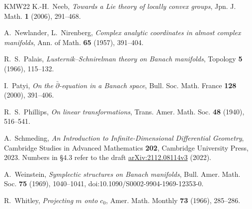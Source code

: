 \begin{thebibliography}{KMW22}
K.-H.~Neeb, \emph{Towards a Lie theory of locally convex groups}, Jpn. J. Math. \textbf{1}
(2006), 291--468.

A.~Newlander, L.~Nirenberg, \emph{Complex analytic coordinates in almost complex manifolds},
Ann. of Math. \textbf{65} (1957), 391--404.

R.~S.~Palais, \emph{Lusternik--Schnirelman theory on Banach manifolds}, Topology \textbf{5}
(1966), 115--132.

I.~Patyi, \emph{On the $\bar\partial$-equation in a Banach space}, Bull. Soc. Math. France
\textbf{128} (2000), 391--406.

R.~S.~Phillips, \emph{On linear transformations}, Trans. Amer. Math. Soc. \textbf{48} (1940),
516--541.

A.~Schmeding, \emph{An Introduction to Infinite-Dimensional Differential Geometry}, Cambridge
Studies in Advanced Mathematics \textbf{202}, Cambridge University Press, 2023. Numbers in
\S4.3 refer to the draft \href{https://arxiv.org/abs/2112.08114v3}{arXiv:2112.08114v3} (2022).

A.~Weinstein, \emph{Symplectic structures on Banach manifolds}, Bull. Amer. Math. Soc.
\textbf{75} (1969), 1040--1041, doi:10.1090/S0002-9904-1969-12353-0.

R.~Whitley, \emph{Projecting $m$ onto $c_0$}, Amer. Math. Monthly \textbf{73} (1966), 285--286.

\end{thebibliography}
